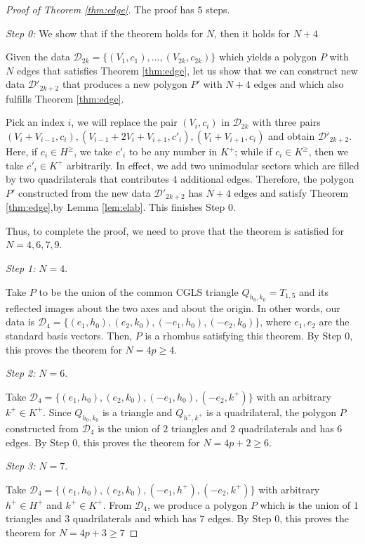 \documentclass[a4paper]{article}
\begin{document}
\begin{proof}[Proof of Theorem \ref{thm:edge}] The proof has $5$ steps.

	\textit{Step 0:} We show that if the theorem holds for $N$, then it holds for $N+4$
    
    Given the data $\mathcal{D}_{2k} = \{(V_1,c_1), \dots, (V_{2k},c_{2k})\}$ which yields a polygon $P$ with $N$ edges that satisfies Theorem \ref{thm:edge}, let us show that we can construct new data $\mathcal{D'}_{2k+2}$ that produces a new polygon $P'$ with $N+4$ edges and which also fulfills Theorem \ref{thm:edge}.
    
    Pick an index $i$, we will replace the pair $(V_i,c_i)$ in $\mathcal{D}_{2k}$ with three pairs $(V_i + V_{i-1}, c_i), (V_{i-1} + 2V_i + V_{i+1}, c'_{i}), (V_i + V_{i+1}, c_i)$ and obtain $\mathcal{D}'_{2k+2}$. Here, if $c_i \in H^\geq$, we take $c'_i$ to be any number in $K^+$; while if $c_i \in K^\geq$, then we take $c'_i \in K^+$ arbitrarily. In effect, we add two unimodular sectors which are filled by two quadrilaterals that contributes $4$ additional edges. Therefore, the polygon $P'$ constructed from the new data $\mathcal{D}'_{2k+2}$ has $N+4$ edges and satisfy Theorem \ref{thm:edge},by Lemma \ref{lem:elab}. This finishes Step 0.
    
    Thus, to complete the proof, we need to prove that the theorem is satisfied for $N = 4,6,7,9$.
    
    \textit{Step 1:} $N=4$.
    
    Take $P$ to be the union of the common CGLS triangle $Q_{h_0,k_0} = T_{1,5}$ and its reflected images about the two axes and about the origin. In other words, our data is $\mathcal{D}_4 = \{(e_1,h_0), (e_2,k_0), (-e_1,h_0), (-e_2,k_0)\}$, where $e_1,e_2$ are the standard basis vectors. Then, $P$ is a rhombus satisfying this theorem. By Step 0, this proves the theorem for $N = 4p \geq 4$.
    
    \textit{Step 2:} $N=6$.
    
    Take $\mathcal{D}_4 = \{(e_1,h_0), (e_2,k_0), (-e_1,h_0), (-e_2,k^+)\}$ with an arbitrary $k^+ \in K^+$. Since $Q_{h_0,k_0}$ is a triangle and $Q_{h^+,k^+}$ is a quadrilateral, the polygon $P$ constructed from $\mathcal{D}_4$ is the union of $2$ triangles and $2$ quadrilaterals and has $6$ edges. By Step 0, this proves the theorem for $N = 4p+2 \geq 6$.
    
    \textit{Step 3:} $N=7$.
    
    Take $\mathcal{D}_4 = \{(e_1,h_0), (e_2,k_0), (-e_1,h^+), (-e_2,k^+)\}$ with arbitrary $h^+ \in H^+$ and $k^+ \in K^+$. From $\mathcal{D}_4$, we produce a polygon $P$ which is the union of $1$ triangles and $3$ quadrilaterals and which has $7$ edges. By Step 0, this proves the theorem for $N = 4p+3 \geq 7$
    

\end{proof}
\end{document}
